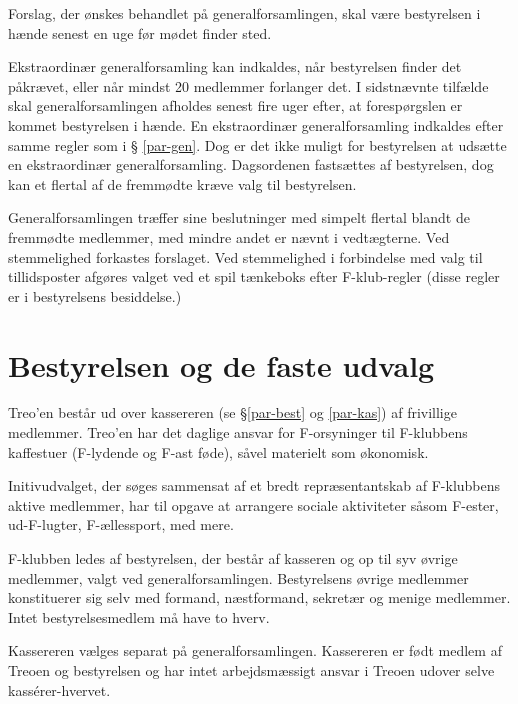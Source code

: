 \documentclass[a4paper,12pt,danish]{article}
\begin{document}
\begin{list}
Forslag, der ønskes behandlet på generalforsamlingen, skal
være bestyrelsen i hænde senest en uge før mødet finder
  sted.
  
\item Ekstraordinær generalforsamling kan indkaldes, når
  bestyrelsen finder det påkrævet, eller når mindst 20 medlemmer 
  forlanger det. I sidstnævnte tilfælde skal generalforsamlingen afholdes 
	senest fire uger efter, at forespørgslen er kommet bestyrelsen i 
	hænde.
  En ekstraordinær generalforsamling indkaldes efter samme regler som i \S
  \ref{par-gen}. Dog er det ikke muligt for bestyrelsen at udsætte en ekstraordinær
  generalforsamling. Dagsordenen fastsættes af bestyrelsen, dog kan et flertal 
  af de fremmødte kræve valg til bestyrelsen. 
  
\item \label{gen-regler} Generalforsamlingen træffer sine beslutninger med 
  simpelt flertal blandt de fremmødte medlemmer, med mindre andet er nævnt i vedtægterne.
  Ved stemmelighed forkastes forslaget. 
  Ved stemmelighed i forbindelse med valg til tillidsposter afgøres valget 
  ved et spil tænkeboks efter F-klub-regler (disse regler er i bestyrelsens besiddelse.)

\section{Bestyrelsen og de faste udvalg}

\item Treo'en består ud over kassereren (se \S \ref{par-best} og
  \ref{par-kas}) af frivillige medlemmer. Treo'en har det daglige
  ansvar for F-orsyninger til F-klubbens kaffestuer (F-lydende og F-ast føde),
  såvel materielt som økonomisk. 
  
\item Initivudvalget, der søges sammensat af et bredt
  repræsentantskab af F-klubbens aktive medlemmer, har til opgave at
  arrangere sociale aktiviteter såsom F-ester, ud-F-lugter,
  F-ællessport, med mere.
  
\item \label{par-best} F-klubben ledes af bestyrelsen, der består
  af kasseren og op til syv øvrige medlemmer, valgt ved
  generalforsamlingen.  Bestyrelsens øvrige medlemmer konstituerer sig
  selv med formand, næstformand, sekretær og menige medlemmer. Intet
  bestyrelsesmedlem må have to hverv.

\item \label{par-kas} Kassereren vælges separat på
  generalforsamlingen.  Kassereren er født medlem af Treoen og
  bestyrelsen og har intet arbejdsmæssigt ansvar i Treoen udover
  selve kass\'{e}rer-hvervet.


\end{list}
\end{document}
